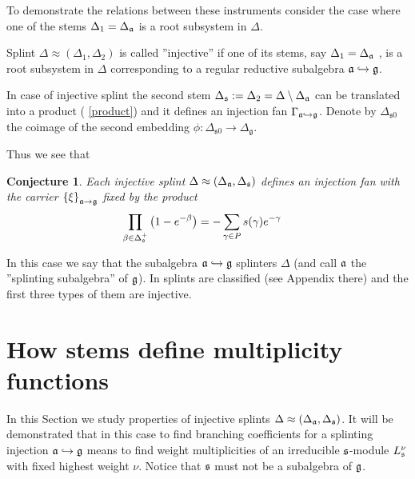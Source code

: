 \documentclass[12pt]{article}
\newtheorem{Cnj}[Def]{Conjecture}
\begin{document}
To demonstrate the relations between these instruments consider the case
where one of the stems $\Delta _{1}=\Delta _{\frak{a}}$ is a root subsystem
in $\Delta $.

Splint $\Delta \approx (\Delta _{1},\Delta _{2})$ is called ''injective'' if
one of its stems, say $\Delta _{1}=\Delta _{\frak{a}}$ , is a root subsystem
in $\Delta $ corresponding to a regular reductive subalgebra $\frak{a}%
\hookrightarrow \frak{g}$.

In case of injective splint the second stem $\Delta _{\frak{s}}:=\Delta
_{2}=\Delta \setminus \Delta _{\frak{a}}$ can be translated into a product (%
\ref{product}) and it defines an injection fan $\Gamma _{\frak{a}%
\hookrightarrow \frak{g}}$. Denote by $\Delta_{\mathfrak{s}0}$ the coimage of the second embedding $\phi:\Delta_{\mathfrak{s}0}\to \Delta_{\mathfrak{g}}$.

Thus we see that

\begin{Cnj}
Each injective splint $\Delta \approx (\Delta _{\frak{a}},\Delta _{\frak{s}})
$ defines an injection fan with the carrier $\left\{ \xi \right\} _{\frak{a}%
\rightarrow \frak{g}}$ fixed by the product
\begin{equation}
\prod_{\beta \in \Delta _{\frak{s}}^{+}}\left( 1-e^{-\beta }\right)
=-\sum_{\gamma \in P}s(\gamma )e^{-\gamma }\quad   \label{splint product}
\end{equation}
\end{Cnj}

In this case we say that the subalgebra $\frak{a}\hookrightarrow \frak{g}$
splinters $\Delta $ (and call $\frak{a}$ the ''splinting subalgebra'' of $%
\frak{g}$). In \cite{richter2008splints} splints are classified (see Appendix there)
and the first three types of them are injective.

\section{How stems define multiplicity functions}

\label{sec:stems and multiplicity functions}

In this Section we study properties of injective splints  $\Delta \approx (\Delta _{\frak{a}},\Delta _{\frak{s}})
$. It will
be demonstrated that in this case to find branching
coefficients for a splinting injection $\frak{a}\hookrightarrow
\frak{g}$ means to find weight multiplicities of an irreducible
$\frak{s}$-module $L_{\frak{s}}^{\nu }$ with fixed highest weight
$\nu $. Notice that $\frak{s}$ must not be a subalgebra of
$\frak{g}$.
\end{document}
